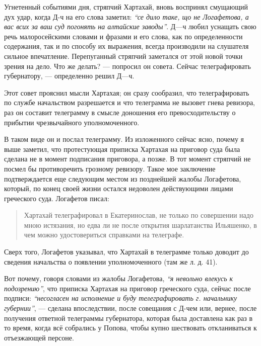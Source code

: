 \documentclass[a4paper,20pt]{article}
\begin{document}
Угнетенный событиями дня, стряпчий Хартахай, вновь воспринял смущающий дух
удар, когда Д-ч на его слова заметил: \emph{``се дило таке, що не Логафетова, а
вас всих за ваш суд погонять на алтайские заводы''}. Д—ч любил уснащать свою
речь малоросейскими словами и фразами и его слова, как по определенности
содержания, так и по способу их выражения, всегда производили на слушателя
сильное впечатление.  Перепуганный стряпчий заметался от этой новой точки
зрения на дело. Что же делать? — попросил он совета. Сейчас телеграфировать
губернатору, — определенно решил Д—ч.

Этот совет прояснил мысли Хартахая; он сразу
сообразил, что телеграфировать по службе начальством
разрешается и что телеграмма не вызовет гнева ревизора,
раз он составит телеграмму в смысле доношения его превосходительству о прибытии чрезвычайного
уполномоченного.
 
В таком виде он и послал телеграмму. Из изложенного сейчас ясно, почему я выше
заметил, что протестующая приписка Хартахая на приговор суда была сделана не в
момент подписания приговора, а позже. В тот момент стряпчий не посмел бы
противоречить грозному ревизору. Такое мое заключение подтверждается еще
следующим местом из позднейшей жалобы Логафетова, который, по конец своей жизни
остался недоволен действующими лицами греческого суда.
Логафетов писал: 

\begin{quote}
\em\bfseries

Хартахай телеграфировал в Екатеринослав, не только по совершении надо мною
истязания, но едва ли не после открытия шарлатанства Ильяшенко, в чем
можно удостовериться справками на телеграфе.  

\end{quote}

Сверх того, Логафетов указывал, что Хартахай в телеграмме только доводит до сведения начальства о появлении уполномоченного
(там же л. д. 41).

Вот почему, говоря словами из жалобы Логафетова,
\emph{``я невольно влекусь к подозрению''}, что приписка Хартахая
на приговор греческого суда, сейчас после подписи: \emph{``несогласен на исполнение и буду телеграфировать 
г. начальнику губернии''}, — сделана впоследствии, после совещания с
Д-чем или, вернее, после получения ответной телеграммы
губернатора, которая была доставлена как раз в то время,
когда всё собрались у Попова, чтобы купно шествовать откланиваться к отъезжающей персоне.
\end{document}
